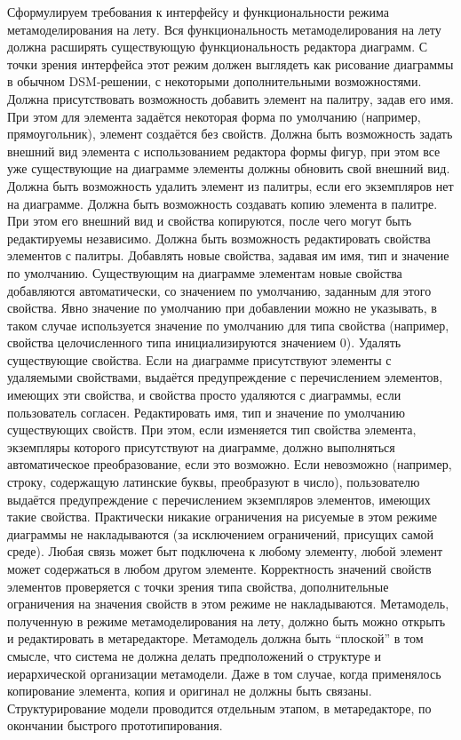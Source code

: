 	Сформулируем требования к интерфейсу и функциональности режима метамоделирования на лету.
Вся функциональность метамоделирования на лету должна расширять существующую функциональность редактора диаграмм. С точки зрения интерфейса этот режим должен выглядеть как рисование диаграммы в обычном DSM-решении, с некоторыми дополнительными возможностями.
Должна присутствовать возможность добавить элемент на палитру, задав его имя. При этом для элемента задаётся некоторая форма по умолчанию (например, прямоугольник), элемент создаётся без свойств.
Должна быть возможность задать внешний вид элемента с использованием редактора формы фигур, при этом все уже существующие на диаграмме элементы должны обновить свой внешний вид.
Должна быть возможность удалить элемент из палитры, если его экземпляров нет на диаграмме.
Должна быть возможность создавать копию элемента в палитре. При этом его внешний вид и свойства копируются, после чего могут быть редактируемы независимо.
Должна быть возможность редактировать свойства элементов с палитры.
Добавлять новые свойства, задавая им имя, тип и значение по умолчанию. Существующим на диаграмме элементам новые свойства добавляются автоматически, со значением по умолчанию, заданным для этого свойства. Явно значение по умолчанию при добавлении можно не указывать, в таком случае используется значение по умолчанию для типа свойства (например, свойства целочисленного типа инициализируются значением 0). 
Удалять существующие свойства. Если на диаграмме присутствуют элементы с удаляемыми свойствами, выдаётся предупреждение с перечислением элементов, имеющих эти свойства, и свойства просто удаляются с диаграммы, если пользователь согласен.
Редактировать имя, тип и значение по умолчанию существующих свойств. При этом, если изменяется тип свойства элемента, экземпляры которого присутствуют на диаграмме, должно выполняться автоматическое преобразование, если это возможно. Если невозможно (например, строку, содержащую латинские буквы, преобразуют в число), пользователю выдаётся предупреждение с перечислением экземпляров элементов, имеющих такие свойства.
Практически никакие ограничения на рисуемые в этом режиме диаграммы не накладываются (за исключением ограничений, присущих самой среде). Любая связь может быт подключена к любому элементу, любой элемент может содержаться в любом другом элементе. Корректность значений свойств элементов проверяется с точки зрения типа свойства, дополнительные ограничения на значения свойств в этом режиме не накладываются.
Метамодель, полученную в режиме метамоделирования на лету, должно быть можно открыть и редактировать в метаредакторе. Метамодель должна быть “плоской” в том смысле, что система не должна делать предположений о структуре и иерархической организации метамодели. Даже в том случае, когда применялось копирование элемента, копия и оригинал не должны быть связаны. Структурирование модели проводится отдельным этапом, в метаредакторе, по окончании быстрого прототипирования.
